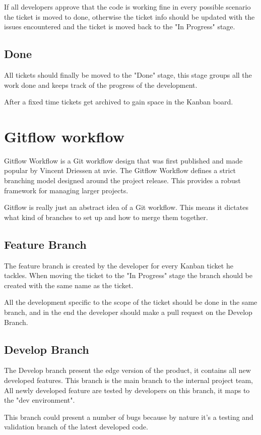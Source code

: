 \begin{spacing}{1.2}
If all developers approve that the code is working fine in every possible scenario the ticket is moved to done, otherwise the ticket info should be updated with the issues encountered and the ticket is moved back to the "In Progress" stage.

\subsection{Done}
All tickets should finally be moved to the "Done" stage, this stage groups all the work done and keeps track of the progress of the development.


After a fixed time tickets get archived to gain space in the Kanban board.
\section{Gitflow workflow }
Gitflow Workflow is a Git workflow design that was first published and made popular by Vincent Driessen at nvie. The Gitflow Workflow defines a strict branching model designed around the project release. This provides a robust framework for managing larger projects.

Gitflow is really just an abstract idea of a Git workflow. This means it dictates what kind of branches to set up and how to merge them together.
\subsection{Feature Branch}
The feature branch is created by the developer for every Kanban ticket he tackles. When moving the ticket to the "In Progress" stage the branch should be created with the same name as the ticket.

All the development specific to the scope of the ticket should be done in the same branch, and in the end the developer should make a pull request on the Develop Branch.
\subsection{Develop Branch}
The Develop branch present the edge version of the product, it contains all new developed features. This branch is the main branch to the internal project team, All newly developed feature are tested by developers on this branch, it maps to the "dev environment".

This branch could present a number of bugs because by nature it's a testing and validation branch of the latest developed code.


\end{spacing}
